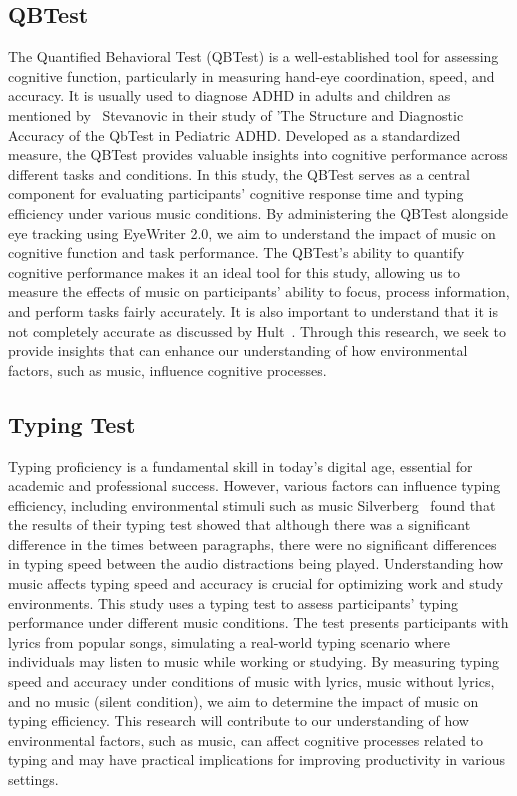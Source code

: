 \documentclass[manuscript, screen, review]{acmart} %
\begin{document}
\subsection{QBTest}
The Quantified Behavioral Test (QBTest) is a well-established tool for assessing cognitive function, particularly in measuring hand-eye coordination, speed, and accuracy. 
It is usually used to diagnose ADHD in adults and children as mentioned by~\cite{Stevanovic} Stevanovic in their study of 'The Structure and Diagnostic Accuracy of the QbTest in Pediatric ADHD.
Developed as a standardized measure, the QBTest provides valuable insights into cognitive performance across different tasks and conditions.
In this study, the QBTest serves as a central component for evaluating participants' cognitive response time and typing efficiency under various music conditions.
By administering the QBTest alongside eye tracking using EyeWriter 2.0, we aim to understand the impact of music on cognitive function and task performance.
The QBTest's ability to quantify cognitive performance makes it an ideal tool for this study, allowing us to measure the effects of music on participants' ability to focus, process information, and perform tasks fairly accurately. 
It is also important to understand that it is not completely accurate as discussed by Hult~\cite{Hult}.
Through this research, we seek to provide insights that can enhance our understanding of how environmental factors, such as music, influence cognitive processes.

\subsection{Typing Test}
Typing proficiency is a fundamental skill in today's digital age, essential for academic and professional success. 
However, various factors can influence typing efficiency, including environmental stimuli such as music Silverberg~\cite{AudioDistractionsAshley} found that the results of their typing test showed that although there was a significant difference in the times between paragraphs, there were no significant differences in typing speed between the audio distractions being played. 
Understanding how music affects typing speed and accuracy is crucial for optimizing work and study environments.
This study uses a typing test to assess participants' typing performance under different music conditions. 
The test presents participants with lyrics from popular songs, simulating a real-world typing scenario where individuals may listen to music while working or studying.
By measuring typing speed and accuracy under conditions of music with lyrics, music without lyrics, and no music (silent condition), we aim to determine the impact of music on typing efficiency. 
This research will contribute to our understanding of how environmental factors, such as music, can affect cognitive processes related to typing and may have practical implications for improving productivity in various settings.
\end{document}
